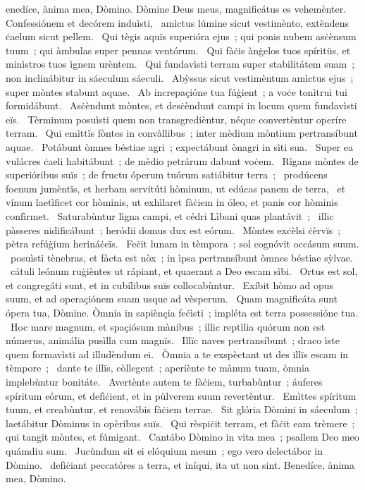 { }
{%
enedíce, ànima mea, Dòmino. Dòmine Deus meus, magnificátus es vehemènter. Confessiónem et decórem induìsti, 
~amìctus lúmine sicut vestimènto, extèndens ċaelum sicut pellem. 
~Qui tègis aquïs superióra ejus~; qui ponis nubem asċènsum tuum~; qui àmbulas super pennas ventórum. 
~Qui fàċis ànġelos tuos spíritüs, et minìstros tuos ìgnem urèntem. 
~Qui fundavìsti terram super stabilitátem suam~; non inclinábitur in sáeculum sáeculi. 
~Abỳssus sicut vestimèntum amìctus ejus~; super mòntes stabunt aquae. 
~Ab increpaçióne tua fúġient~; a voċe tonìtrui tui formidábunt. 
~Asċèndunt mòntes, et desċèndunt campi in locum quem fundavìsti eïs. 
~Tèrminum posuìsti quem non transgredièntur, néque convertèntur operíre terram. 
~Qui emìttïs fòntes in convàllibus~; inter mèdium mòntium pertransíbunt aquae. 
~Potábunt òmnes béstiae agri~; expectábunt ònagri in sìti sua. 
~Super ea vulácres ċaeli habitábunt~; de mèdio petrárum dabunt voċem. 
~Rìgans mòntes de superióribus suïs~; de fructu óperum tuórum satiábitur terra~; 
~prodúcens foenum jumèntïs, et herbam servitúti hòminum, ut edúcas panem de terra, 
~et vínum laetìficet cor hòminis, ut exhìlaret fàċiem in óleo, et panis cor hòminis confìrmet. 
~Saturabùntur lìgna campi, et cédri Lìbani quas plantávit~;
~illic pàsseres nidificábunt~; heródii domus dux est eórum. 
~Mòntes exċèlsi ċèrvïs~; pètra refúġium herináċeïs. 
~Feċit lunam in tèmpora~; sol cognóvit occásum suum. 
~posuìsti tènebras, et fàcta est nòx~; in ìpsa pertransíbunt òmnes béstiae sỳlvae. 
~cátuli leónum ruġièntes ut rápiant, et quaerant a Deo escam sìbi. 
~Ortus est sol, et congregáti sunt, et in cubílibus suïs collocabùntur. 
~Exíbit hòmo ad opus suum, et ad operaçiónem suam usque ad vèsperum. 
~Quam magnificáta sunt ópera tua, Dòmine. Òmnia in sapiènçia feċìsti~; impléta est terra possessióne tua. 
~Hoc mare magnum, et spaçiósum mànibus~; illic reptìlia quórum non est númerus, animália pusìlla cum magnïs. 
~Illïc naves pertransíbunt~; draco ìste quem formavìsti ad illudèndum ei. 
~Òmnia a te exspèctant ut des illïs escam in tèmpore~; 
~dante te illïs, còllegent~; aperiènte te mànum tuam, òmnia implebùntur bonitáte. 
~Avertènte autem te fàċiem, turbabùntur~; áuferes spíritum eórum, et defìċient, et in pùlverem suum revertèntur. 
~Emìttes spíritum tuum, et creabùntur, et renovábis fàċiem terrae. 
~Sit glória Dòmini in sáeculum~; laetábitur Dòminus in opèribus suïs. 
~Qui rèspiċit terram, et fàċit eam trèmere~; qui tangit mòntes, et fúmigant. 
~Cantábo Dòmino in vita mea~; psallem Deo meo quámdiu sum. 
~Jucùndum sit ei elóquium meum~; ego vero delectábor in Dòmino. 
~defìċiant peccatóres a terra, et iníqui, ita ut non sint. Benedíce, ànima mea, Dòmino. 
}
